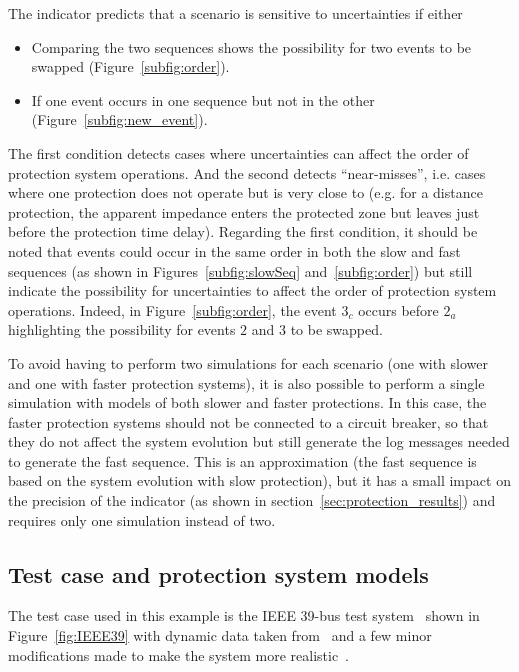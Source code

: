 The indicator predicts that a scenario is sensitive to uncertainties if either

\begin{itemize}
    \item Comparing the two sequences shows the possibility for two events to be swapped (Figure~\ref{subfig:order}).
    \item If one event occurs in one sequence but not in the other (Figure~\ref{subfig:new_event}).
\end{itemize}

The first condition detects cases where uncertainties can affect the order of protection system operations. And the second detects ``near-misses'', i.e. cases where one protection does not operate but is very close to (e.g. for a distance protection, the apparent impedance enters the protected zone but leaves just before the protection time delay). Regarding the first condition, it should be noted that events could occur in the same order in both the slow and fast sequences (as shown in Figures~\ref{subfig:slowSeq} and~\ref{subfig:order}) but still indicate the possibility for uncertainties to affect the order of protection system operations. Indeed, in Figure~\ref{subfig:order}, the event \(3_c\) occurs before \(2_a\) highlighting the possibility for events \(2\) and \(3\) to be swapped.

To avoid having to perform two simulations for each scenario (one with slower and one with faster protection systems), it is also possible to perform a single simulation with models of both slower and faster protections. In this case, the faster protection systems should not be connected to a circuit breaker, so that they do not affect the system evolution but still generate the log messages needed to generate the fast sequence. This is an approximation (the fast sequence is based on the system evolution with slow protection), but it has a small impact on the precision of the indicator (as shown in section~\ref{sec:protection_results}) and requires only one simulation instead of two.


\subsection{Test case and protection system models}
\label{sec:protection_test_case}

The test case used in this example is the IEEE 39-bus test system~\cite{IEEE39} shown in Figure~\ref{fig:IEEE39} with dynamic data taken from~\cite{IEEE39Dynamic} and a few minor modifications made to make the system more realistic~\cite{ISGT2023_Protections}.

